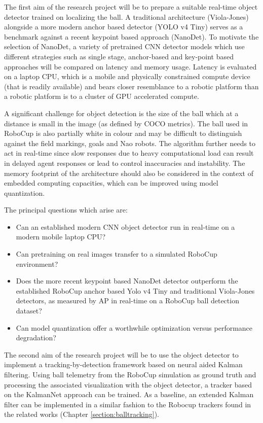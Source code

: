 \documentclass[a4paper,twoside,12pt]{report}
\begin{document}
The first aim of the research project will be to prepare a suitable real-time object detector trained on localizing the ball. A traditional architecture (Viola-Jones) alongside a more modern anchor based detector (YOLO v4 Tiny) serves as a benchmark against a recent keypoint based approach (NanoDet). To motivate the selection of NanoDet, a variety of pretrained CNN detector models which use different strategies such as single stage, anchor-based and key-point based approaches will be compared on latency and memory usage. Latency is evaluated on a laptop CPU, which is a mobile and physically constrained compute device (that is readily available) and bears closer resemblance to a robotic platform than a robotic platform is to a cluster of GPU accelerated compute. 

A significant challenge for object detection is the size of the ball which at a distance is small in the image (as defined by COCO metrics). The ball used in RoboCup is also partially white in colour and may be difficult to distinguish against the field markings, goals and Nao robots. The algorithm further needs to act in real-time since slow responses due to heavy computational load can result in delayed agent responses or lead to control inaccuracies and instability. The memory footprint of the architecture should also be considered in the context of embedded computing capacities, which can be improved using model quantization.

The principal questions which arise are:
\begin{itemize}
    \item Can an established modern CNN object detector run in real-time on a modern mobile laptop CPU?
    \item Can pretraining on real images transfer to a simulated RoboCup environment?
    \item Does the more recent keypoint based NanoDet detector outperform the established RoboCup anchor based Yolo v4 Tiny and traditional Viola-Jones detectors, as measured by AP in real-time on a RoboCup ball detection dataset? 
    \item Can model quantization offer a worthwhile optimization versus performance degradation? 
\end{itemize}

The second aim of the research project will be to use the object detector to implement a tracking-by-detection framework based on neural aided Kalman filtering. Using ball telemetry from the RoboCup simulation as ground truth and processing the associated visualization with the object detector, a tracker based on the KalmanNet approach can be trained. As a baseline, an extended Kalman filter can be implemented in a similar fashion to the Robocup trackers found in the related works (Chapter \ref{section:balltracking}). 
\end{document}
